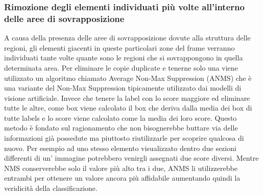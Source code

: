 \subsubsection{Rimozione degli elementi individuati più volte all'interno delle aree di sovrapposizione}
A causa della presenza delle aree di sovrapposizione dovute alla struttura delle regioni, gli elementi giacenti in queste particolari zone del frame verranno individuati tante volte quante sono le regioni che si sovrappongono in quella determinata area. Per eliminare le copie duplicate e tenerne solo una viene utilizzato un algoritmo chiamato Average Non-Max Suppression (ANMS) che è una variante del Non-Max Suppression tipicamente utilizzato dai modelli di visione artificiale. Invece che tenere la label con lo score maggiore ed eliminare tutte le altre, come box viene calcolato il box che deriva dalla media dei box di tutte labels e lo score viene calcolato come la media dei loro score.
Questo metodo è fondato sul ragionamento che non bisognerebbe buttare via delle informazioni già possedute ma piuttosto riutilizzarle per scoprire qualcosa di nuovo. Per esempio ad uno stesso elemento visualizzato dentro due sezioni differenti di un' immagine potrebbero venirgli assegnati due score diversi. Mentre NMS conserverebbe solo il valore più alto tra i due, ANMS li utilizzerebbe entrambi per ottenere un valore ancora più affidabile aumentando quindi la veridicità della classificazione.
